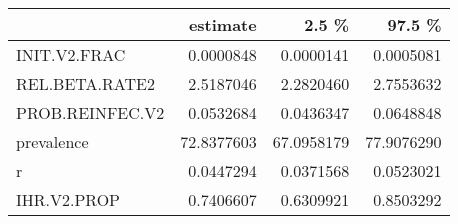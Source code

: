 
\begin{tabular}{l|r|r|r}
\hline
  & estimate & 2.5 \% & 97.5 \%\\
\hline
INIT.V2.FRAC & 0.0000848 & 0.0000141 & 0.0005081\\
\hline
REL.BETA.RATE2 & 2.5187046 & 2.2820460 & 2.7553632\\
\hline
PROB.REINFEC.V2 & 0.0532684 & 0.0436347 & 0.0648848\\
\hline
prevalence & 72.8377603 & 67.0958179 & 77.9076290\\
\hline
r & 0.0447294 & 0.0371568 & 0.0523021\\
\hline
IHR.V2.PROP & 0.7406607 & 0.6309921 & 0.8503292\\
\hline
\end{tabular}